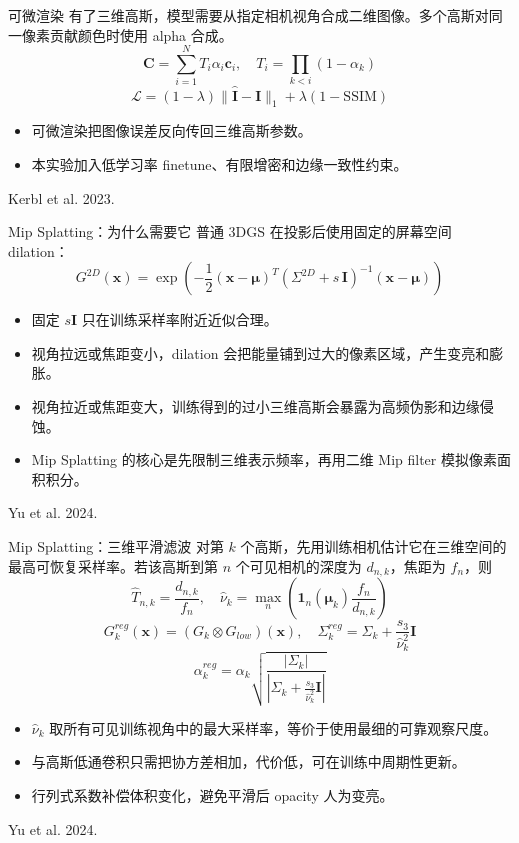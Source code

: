 \documentclass[UTF8,aspectratio=169]{ctexbeamer}
\newcommand{\refline}[1]{\vfill{\tiny #1}}
\begin{document}
\begin{frame}{可微渲染}
\small
有了三维高斯，模型需要从指定相机视角合成二维图像。多个高斯对同一像素贡献颜色时使用 alpha 合成。
\[
\mathbf{C} =
\sum_{i=1}^{N} T_i \alpha_i \mathbf{c}_i,
\quad
T_i = \prod_{k<i}(1-\alpha_k)
\]
\[
\mathcal{L} =
(1-\lambda)\|\hat{\mathbf{I}}-\mathbf{I}\|_1
+ \lambda(1-\mathrm{SSIM})
\]
\begin{itemize}
\item 可微渲染把图像误差反向传回三维高斯参数。
\item 本实验加入低学习率 finetune、有限增密和边缘一致性约束。
\end{itemize}
\refline{Kerbl et al. 2023.}
\end{frame}

\begin{frame}{Mip Splatting：为什么需要它}
\small
普通 3DGS 在投影后使用固定的屏幕空间 dilation：
\[
G^{2D}(\mathbf{x}) =
\exp\left(
-\frac{1}{2}
(\mathbf{x}-\boldsymbol{\mu})^T
(\Sigma^{2D}+s\,\mathbf{I})^{-1}
(\mathbf{x}-\boldsymbol{\mu})
\right)
\]
\begin{itemize}
\item 固定 \(s\mathbf{I}\) 只在训练采样率附近近似合理。
\item 视角拉远或焦距变小，dilation 会把能量铺到过大的像素区域，产生变亮和膨胀。
\item 视角拉近或焦距变大，训练得到的过小三维高斯会暴露为高频伪影和边缘侵蚀。
\item Mip Splatting 的核心是先限制三维表示频率，再用二维 Mip filter 模拟像素面积积分。
\end{itemize}
\refline{Yu et al. 2024.}
\end{frame}

\begin{frame}{Mip Splatting：三维平滑滤波}
\scriptsize
对第 \(k\) 个高斯，先用训练相机估计它在三维空间的最高可恢复采样率。若该高斯到第 \(n\) 个可见相机的深度为 \(d_{n,k}\)，焦距为 \(f_n\)，则
\[
\hat{T}_{n,k}=\frac{d_{n,k}}{f_n},
\quad
\hat{\nu}_k =
\max_{n}
\left(
\mathbf{1}_{n}(\boldsymbol{\mu}_k)
\frac{f_n}{d_{n,k}}
\right)
\]
\[
G^{reg}_k(\mathbf{x})
=
(G_k \otimes G_{low})(\mathbf{x}),
\quad
\Sigma^{reg}_k =
\Sigma_k+\frac{s_3}{\hat{\nu}_k^2}\mathbf{I}
\]
\[
\alpha^{reg}_k =
\alpha_k
\sqrt{
\frac{|\Sigma_k|}
{|\Sigma_k+\frac{s_3}{\hat{\nu}_k^2}\mathbf{I}|}
}
\]
\begin{itemize}
\item \(\hat{\nu}_k\) 取所有可见训练视角中的最大采样率，等价于使用最细的可靠观察尺度。
\item 与高斯低通卷积只需把协方差相加，代价低，可在训练中周期性更新。
\item 行列式系数补偿体积变化，避免平滑后 opacity 人为变亮。
\end{itemize}
\refline{Yu et al. 2024.}
\end{frame}
\end{document}
